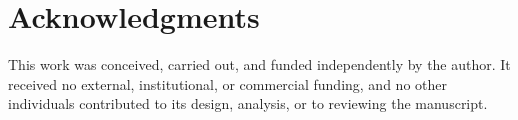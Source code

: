 \section*{Acknowledgments}

This work was conceived, carried out, and funded independently by the author. It received no external, institutional, or commercial funding, and no other individuals contributed to its design, analysis, or to reviewing the manuscript.
